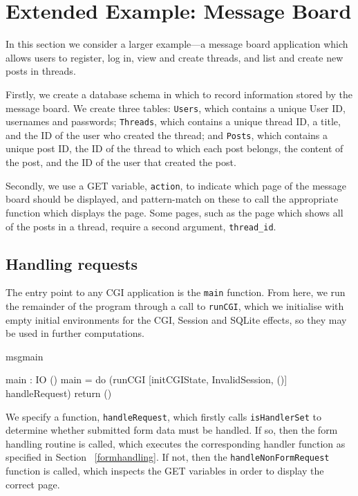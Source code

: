 \section{Extended Example: Message Board}
\label{messageboard}
In this section we consider a larger example---a message board application
which allows users to register, log in, view and create threads, and list and
create new posts in threads. 

Firstly, we create a database schema in which to record information stored by
the message board. We create three tables: \texttt{Users}, which contains a
unique User ID, usernames and passwords; \texttt{Threads}, which contains a
unique thread ID, a title, and the ID of the user who created the thread; and
\texttt{Posts}, which contains a unique post ID, the ID of the thread to which
each post belongs, the content of the post, and the ID of the user that created
the post.

Secondly, we use a GET variable, \texttt{action}, to indicate which page of the
message board should be displayed, and pattern-match on these to call the
appropriate function which displays the page. Some pages, such as the page
which shows all of the posts in a thread, require a second argument,
\texttt{thread\_id}.  \subsection{Handling requests}
The entry point to any CGI application is the \texttt{main} function. From here, we run the remainder of the program through a call to \texttt{runCGI}, which we initialise with empty initial environments for the CGI, Session and SQLite effects, so they may be used in further computations. 

\begin{SaveVerbatim}{msgmain}

main : IO ()
main = do (runCGI [initCGIState, 
                  InvalidSession, ()] 
           handleRequest)
          return ()

\end{SaveVerbatim}

\noindent
We specify a function, \texttt{handleRequest}, which firstly calls \texttt{isHandlerSet} to determine whether submitted form data must be handled. If so, then the form handling routine is called, which executes the corresponding handler function as specified in Section ~\ref{formhandling}. If not, then the \texttt{handleNonFormRequest} function is called, which inspects the GET variables in order to display the correct page.


